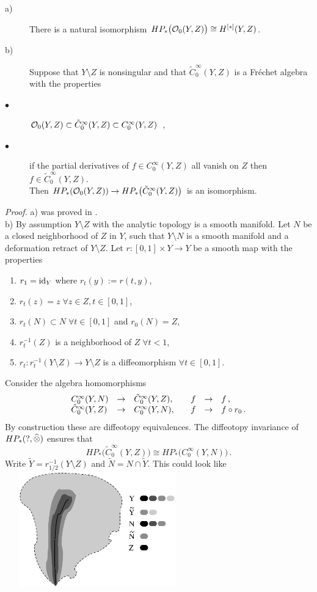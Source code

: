 \begin{thm}\label{thm:1.4}
\begin{description}
\item[a)] There is a natural isomorphism
$HP_* \big( \mathcal O_0 (Y,Z) \big) \cong H^{[*]} (Y,Z)$.
\item[b)] Suppose that $Y \setminus Z$ is nonsingular and that
$\tilde C_0^\infty (Y,Z)$ is a Fr\'echet algebra with the properties
\item[$\bullet$] $\mathcal O_0 (Y,Z) \subset \tilde C_0^\infty (Y,Z) \subset
C_0^\infty (Y,Z)$ \,,
\item[$\bullet$] if the partial derivatives of $f \in C_0^\infty (Y,Z)$ all
vanish on $Z$ then $f \in \tilde C_0^\infty (Y,Z)$.\\
Then $HP_* (\mathcal O_0 (Y,Z)) \to HP_* \big( \tilde C_0^\infty (Y,Z) \big)$ 
is an isomorphism.
\end{description}
\end{thm}
\emph{Proof.}
a) was proved in \cite[Theorem 9]{KNS}.\\
b) By assumption $Y\setminus Z$ with the analytic topology is a smooth manifold. 
Let $N$ be a closed neighborhood of $Z$ in $Y$, such that $Y \setminus N$ is a 
smooth manifold and a deformation retract of $Y \setminus Z$. Let 
$r : [0,1] \times Y \to Y$ be a smooth map with the properties
\begin{enumerate}
\item $r_1 = \mathrm{id}_Y$ where $r_t (y) := r(t,y) $,
\item $r_t (z) = z \; \forall z \in Z , t \in [0,1] $,
\item $r_t (N) \subset N \; \forall t \in [0,1]$ and $r_0 (N) = Z $,
\item $r_t^{-1} (Z)$ is a neighborhood of $Z \; \forall t < 1 $,
\item $r_t \colon r_t^{-1}(Y \setminus Z) \to Y \setminus Z$ is a
diffeomorphism $\forall t \in [0,1] $.
\end{enumerate}
Consider the algebra homomorphisms
\[
\begin{array}{lll@{\qquad}lll}
C_0^\infty (Y,N) & \to & \tilde C_0^\infty (Y,Z), & f & \to & f \,, \\
\tilde C_0^\infty (Y,Z) & \to & C_0^\infty (Y,N), &
f & \to & f \circ r_0 \,.
\end{array}
\]
By construction these are diffeotopy equivalences. The diffeotopy
invariance of $HP_* (?,\widehat{\otimes} )$ \cite[p. 125]{Con} ensures that
\[
HP_* \big( \tilde C_0^\infty (Y,Z) \big) \cong
HP_* \big( C_0^\infty (Y,N) \big) \,.
\]
Write $\tilde Y = r_{1/2}^{-1} (Y \setminus Z)$ and
$\tilde N = N \cap \tilde Y$. This could look like
\\[1mm]
\includegraphics[width=8cm,height=5cm]{ynz}

